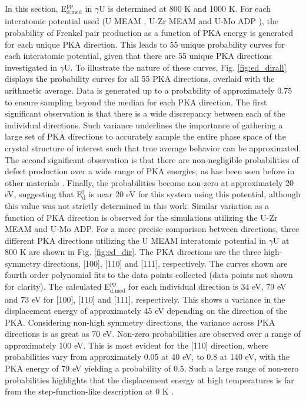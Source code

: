 \documentclass[review]{elsarticle}
\begin{document}
In this section, E$^{\textrm{pp}}_{\textrm{d,med}}$ in $\gamma$U is determined at 800 K and 1000 K. For each interatomic potential used (U MEAM \cite{beeler_meam}, U-Zr MEAM \cite{moore2015} and U-Mo ADP \cite{smirnovaADP}), the probability of Frenkel pair production as a function of PKA energy is generated for each unique PKA direction. This leads to 55 unique probability curves for each interatomic potential, given that there are 55 unique PKA directions investigated in $\gamma$U. To illustrate the nature of these curves, Fig. \ref{fig:ed_dirall} displays the probability curves for all 55 PKA directions, overlaid with the arithmetic average. Data is generated up to a probability of approximately 0.75 to ensure sampling beyond the median for each PKA direction. The first significant observation is that there is a wide discrepancy between each of the individual directions. Such variance underlines the importance of gathering a large set of PKA directions to accurately sample the entire phase space of the crystal structure of interest such that true average behavior can be approximated. The second significant observation is that there are non-negligible probabilities of defect production over a wide range of PKA energies, as has been seen before in other materials \cite{beeler2016, nordlund2006, zepeda-ruiz2003, tsuchihira2013}. Finally, the probabilities become non-zero at approximately 20 eV, suggesting that E$^{\textrm{l}}_{\textrm{d}}$ is near 20 eV for this system using this potential, although this value was not strictly determined in this work. Similar variation as a function of PKA direction is observed for the simulations utilizing the U-Zr MEAM and U-Mo ADP. For a more precise comparison between directions, three different PKA directions utilizing the U MEAM interatomic potential in $\gamma$U at 800 K are shown in Fig. \ref{fig:ed_dir}. The PKA directions are the three high-symmetry directions, [100], [110] and [111], respectively. The curves shown are fourth order polynomial fits to the data points collected (data points not shown for clarity). The calculated E$^{\textrm{pp}}_{\textrm{d,med}}$ for each individual direction is 34 eV, 79 eV and 73 eV for [100], [110] and [111], respectively. This shows a variance in the displacement energy of approximately 45 eV depending on the direction of the PKA. Considering non-high symmetry directions, the variance across PKA directions is as great as 70 eV. Non-zero probabilities are observed over a range of approximately 100 eV. This is most evident for the [110] direction, where probabilities vary from approximately 0.05 at 40 eV, to 0.8 at 140 eV, with the PKA energy of 79 eV yielding a probability of 0.5. Such a large range of non-zero probabilities highlights that the displacement energy at high temperatures is far from the step-function-like description at 0 K \cite{was2007}.
 
\end{document}
